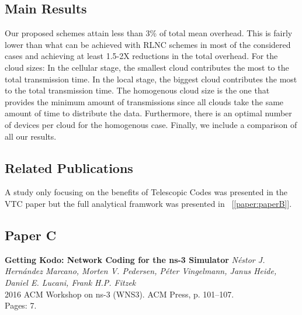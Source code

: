 \subsection*{Main Results}
Our proposed schemes attain less than 3\% of total mean overhead. This is fairly lower than what can be achieved with \ac{RLNC} schemes in most of the considered cases and achieving at least 1.5-2X reductions in the total overhead. For the cloud sizes: In the cellular stage, the smallest cloud contributes the most to the total transmission time. In the local stage, the biggest cloud contributes the most to the total transmission time. The homogenous cloud size is the one that provides the minimum amount of transmissions since all clouds take the same amount of time to distribute the data. Furthermore, there is an optimal number of devices per cloud for the homogenous case. Finally, we include a comparison of all our results. 

\subsection*{Related Publications}
A study only focusing on the benefits of Telescopic Codes was presented in the VTC paper but the full analytical framwork was presented in ~[\ref{paper:paperB}].

\clearpage


\subsection{Paper C}
\textbf{Getting Kodo: Network Coding for the ns-3 Simulator}
\textit{N\'estor J. Hern\'andez Marcano, Morten V. Pedersen, P\'eter
Vingelmann, Janus Heide, Daniel E. Lucani, Frank H.P. Fitzek}
\\ 2016 ACM Workshop on ns-3 (WNS3). ACM Press, p. 101--107.
\\ Pages: 7.
